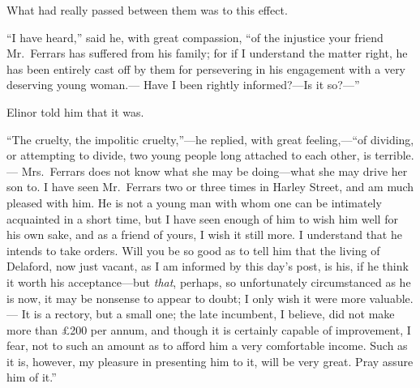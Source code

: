 \documentclass{article}
\begin{document}
What had really passed between them was to this effect.

``I have heard,'' said he, with great compassion,
``of the injustice your friend Mr.\ Ferrars has suffered
from his family; for if I understand the matter right,
he has been entirely cast off by them for persevering
in his engagement with a very deserving young woman.---%
Have I been rightly informed?---Is it so?---''

Elinor told him that it was.

``The cruelty, the impolitic cruelty,''---he replied,
with great feeling,---``of dividing, or attempting to divide,
two young people long attached to each other, is terrible.---%
Mrs.\ Ferrars does not know what she may be doing---what
she may drive her son to.  I have seen Mr.\ Ferrars two
or three times in Harley Street, and am much pleased
with him.  He is not a young man with whom one can
be intimately acquainted in a short time, but I have
seen enough of him to wish him well for his own sake,
and as a friend of yours, I wish it still more.
I understand that he intends to take orders.  Will you
be so good as to tell him that the living of Delaford,
now just vacant, as I am informed by this day's post,
is his, if he think it worth his acceptance---but \emph{that},
perhaps, so unfortunately circumstanced as he is now,
it may be  nonsense to appear to doubt; I only wish it
were more  valuable.--- It is a rectory, but a small one;
the late incumbent, I believe, did not make more than
\pounds 200 per annum, and though it is certainly capable
of improvement, I fear, not to such an amount as
to afford him a very comfortable income.  Such as it is,
however, my pleasure in presenting him to it,
will be very great.  Pray assure him of it.''
\end{document}
